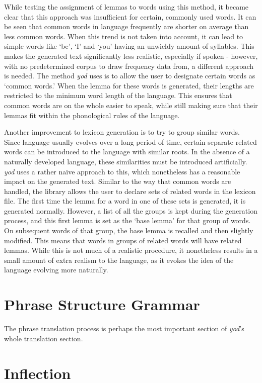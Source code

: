 \documentclass{report}
\begin{document}
	While testing the assignment of lemmas to words using this method, it became clear that this approach was insufficient for certain, commonly used words. It can be seen that common words in language frequently are shorter on average than less common words\cite{miller1958370}\cite{strauss2007word}. When this trend is not taken into account, it can lead to simple words like `be', `I' and `you' having an unwieldy amount of syllables. This makes the generated text significantly less realistic, especially if spoken - however, with no predetermined corpus to draw frequency data from, a different approach is needed. The method \textit{yod} uses is to allow the user to designate certain words as `common words.' When the lemma for these words is generated, their lengths are restricted to the minimum word length of the language. This ensures that common words are on the whole easier to speak, while still making sure that their lemmas fit within the phonological rules of the language.
	
	Another improvement to lexicon generation is to try to group similar words. Since language usually evolves over a long period of time, certain separate related words can be introduced to the language with similar roots. In the absence of a naturally developed language, these similarities must be introduced artificially. \textit{yod} uses a rather na\"ive approach to this, which nonetheless has a reasonable impact on the generated text. Similar to the way that common words are handled, the library allows the user to declare sets of related words in the lexicon file. The first time the lemma for a word in one of these sets is generated, it is generated normally. However, a list of all the groups is kept during the generation process, and this first lemma is set as the `base lemma' for that group of words. On subsequent words of that group, the base lemma is recalled and then slightly modified. This means that words in groups of related words will have related lemmas. While this is not much of a realistic procedure, it nonetheless results in a small amount of extra realism to the language, as it evokes the idea of the language evolving more naturally.
	
	\section{Phrase Structure Grammar}
	
	The phrase translation process is perhaps the most important section of \textit{yod}'s whole translation section. 
	
	\section{Inflection}
   
   \printbibliography
\end{document}

